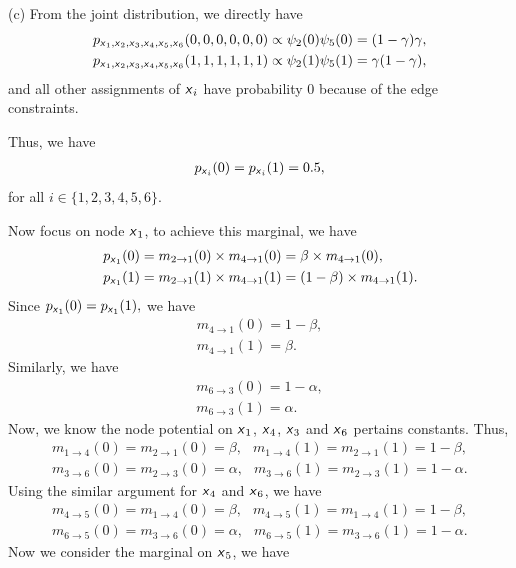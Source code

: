 \documentclass{article}
\newcommand{\s}[1]{\textsf{\textit{#1}}}
\begin{document}
\noindent
(c) From the joint distribution, we directly have
\begin{align*}
	p_{\s{x}_1,\s{x}_2,\s{x}_3,\s{x}_4,\s{x}_5,\s{x}_6}(0,0,0,0,0,0) \propto
	\psi_2(0)\psi_5(0) = (1-\gamma)\gamma,\\
	p_{\s{x}_1,\s{x}_2,\s{x}_3,\s{x}_4,\s{x}_5,\s{x}_6}(1,1,1,1,1,1) \propto
	\psi_2(1)\psi_5(1) = \gamma(1-\gamma),
\end{align*}
and all other assignments of $\s{x}_i$ have probability 0 because of the edge constraints.
%

Thus, we have
\begin{align}
	p_{\s{x}_i}(0) = p_{\s{x}_i}(1) = 0.5,
\end{align}
for all $i\in\{1,2,3,4,5,6\}$.
%

Now focus on node $\s{x}_1$, to achieve this marginal, we have
\begin{align*}
	&p_{\s{x}_1}(0) = m_{2\to 1}(0) \times m_{4\to 1}(0)
				   = \beta \times m_{4\to 1}(0),\\
	&p_{\s{x}_1}(1) = m_{2\to 1}(1) \times m_{4\to 1}(1)
				   = (1-\beta) \times m_{4\to 1}(1).
\end{align*}
% 
Since $p_{\s{x}_1}(0) = p_{\s{x}_1}(1),$ we have
\begin{align}
	m_{4\to 1}(0) = 1- \beta, \label{5c1} \\
	m_{4\to 1}(1) = \beta \label{5c2}.
\end{align}
%
Similarly, we have
\begin{align}
	m_{6\to 3}(0) = 1- \alpha, \label{5c3} \\
	m_{6\to 3}(1) = \alpha. \label{5c4}
\end{align}
%
Now, we know the node potential on $\s{x}_1$, $\s{x}_4$, $\s{x}_3$ and
$\s{x}_6$ pertains constants. Thus,
\begin{align}
	m_{1\to 4}(0) = m_{2\to 1}(0) = \beta,\;\;\,
	m_{1\to 4}(1) = m_{2\to 1}(1) = 1 - \beta,\\
	m_{3\to 6}(0) = m_{2\to 3}(0) = \alpha,\;\;\,
	m_{3\to 6}(1) = m_{2\to 3}(1) = 1 - \alpha.
\end{align}
%
Using the similar argument for $\s{x}_4$
and $\s{x}_6$, we have
\begin{align}
	m_{4\to 5}(0) = m_{1\to 4}(0) = \beta,\;\;\,
	m_{4\to 5}(1) = m_{1\to 4}(1) = 1 - \beta,\\
	m_{6\to 5}(0) = m_{3\to 6}(0) = \alpha,\;\;\,
	m_{6\to 5}(1) = m_{3\to 6}(1) = 1 - \alpha.	
\end{align}
%
Now we consider the marginal on $\s{x}_5$, we have
\end{document}
